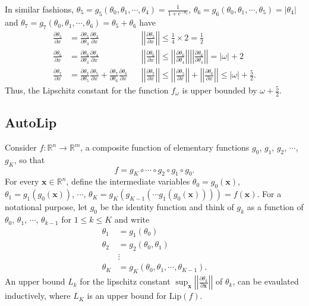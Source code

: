 \documentclass[12pt]{report}
\numberwithin{figure}{chapter}
\theoremstyle{plain}
\theoremstyle{definition}
\theoremstyle{corollary}
\theoremstyle{definition}
\theoremstyle{plain}
\theoremstyle{definition}
\theoremstyle{plain}
\newcommand\lip{\ensuremath{\text{Lip}}}
\newcommand\pa[2]{\ensuremath{\frac{\partial #1}{\partial #2}}}
\newcommand\norm[1]{\ensuremath{\left|\left|#1\right|\right|}}
\begin{document}
In similar fashions,
\(\theta_5=g_5(\theta_0,\theta_1,\cdots,\theta_4)=\frac1{1+e^{-\theta_3}}\),
\(\theta_6=g_6(\theta_0,\theta_1,\cdots,\theta_5)=|\theta_4|\) and
\(\theta_7=g_7(\theta_0,\theta_1,\cdots,\theta_6)=\theta_5+\theta_6\) have
\begin{align*}
\pa{\theta_5}x&=\pa{\theta_5}{\theta_3}\pa{\theta_3}x&&\norm{\pa{\theta_5}x}\le\frac14\times2=\frac12\\
\pa{\theta_6}x&=\pa{\theta_6}{\theta_4}\pa{\theta_4}x&&\norm{\pa{\theta_6}x}
\le\norm{\pa{\theta_6}{\theta_4}}\norm{\pa{\theta_6}{\theta_4}}=|\omega|+2\\
\pa{\theta_7}x&=\pa{\theta_7}{\theta_5}\pa{\theta_5}x+\pa{\theta_7}{\theta_6}\pa{\theta_6}x&&\norm{\pa{\theta_7}x}
\le\norm{\pa{\theta_5}x}+\norm{\pa{\theta_6}x}\le|\omega|+\frac52.
\end{align*}
Thus, the Lipschitz constant for the function \(f_\omega\) is upper bounded by \(\omega+\frac52\).

\subsection{AutoLip}
Consider \(f:\mathbb R^n\to\mathbb R^m\), a composite function of elementary functions \(g_0\), \(g_1\), \(g_2\), \(\cdots\), \(g_K\), so that
\[f={g_K}\circ\cdots\circ{g_2}\circ{g_1}\circ{g_0}.\]
For every \(\boldsymbol x\in\mathbb R^n\), define the intermediate variables
\(\theta_0=g_0(\boldsymbol x)\), \(\theta_1=g_1(g_0(\boldsymbol x))\), \(\cdots\), \(\theta_K=g_K(g_{K-1}(\cdots g_1(g_0(\boldsymbol x))))=f(\boldsymbol x)\).
For a notational purpose, let \(g_0\) be the identity function and think of \(g_k\) as a function of \(\theta_0\), \(\theta_1\), \(\cdots\), \(\theta_{k-1}\) for \(1\le k\le K\) and write
\begin{align*}
\theta_1&=g_1(\theta_0)\\
\theta_2&=g_2(\theta_0,\theta_1)\\
&\vdots\\
\theta_K&=g_K(\theta_0,\theta_1,\cdots,\theta_{K-1}).
\end{align*}
An upper bound \(L_k\) for the lipschitz constant \(\sup_{\boldsymbol x}\left|\left|\frac{\partial\theta_k}{\partial\boldsymbol x}\right|\right|\) of \(\theta_k\), can be evaulated inductively, where \(L_K\) is an upper bound for \(\lip(f)\).
\end{document}
